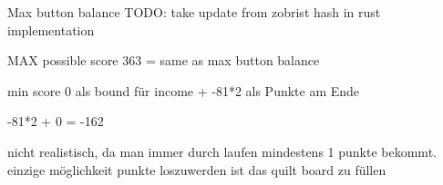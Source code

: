 Max button balance
TODO: take update from zobrist hash in rust implementation


MAX possible score
363 = same as max button balance

min score
0 als bound für income + -81*2 als Punkte am Ende

-81*2 + 0 = -162

nicht realistisch, da man immer durch laufen mindestens 1 punkte bekommt. einzige möglichkeit punkte loszuwerden ist das quilt board zu füllen